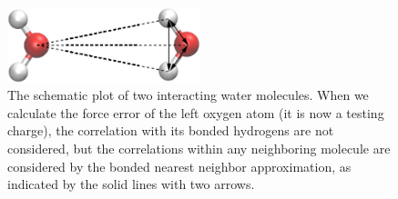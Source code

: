 \documentclass[aps,pre,preprint,unsortedaddress]{revtex4}
\begin{document}
\begin{figure}
  \centering
  \includegraphics[width=0.5\textwidth]{correlation.1.eps}
  \caption{The schematic plot of two interacting water molecules.
    When we calculate the force error of the left oxygen atom (it is now
    a testing charge), the
    correlation with its bonded hydrogens are not considered, but
    the correlations within any neighboring molecule are considered
    by the bonded nearest neighbor approximation,
    as indicated by the solid lines with two arrows.}
  \label{fig:tmp-add0}
\end{figure}
\end{document}
